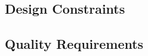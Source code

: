 
\subsection{Design Constraints}
\label{requirements:constraints}

\subsection{Quality Requirements}
\label{requirements:quality}

